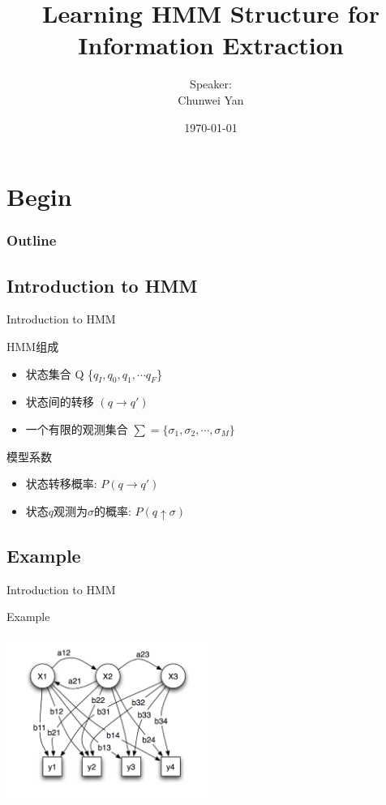 \documentclass{beamer}
\title{Learning HMM Structure for Information Extraction}
\author{Speaker:\\Chunwei Yan}
\institute[PKUSZ]{
    互联网研发中心
}
\date{\today}
\begin{document}
\begin{frame}
  \titlepage
\end{frame}

\section{Begin}
\begin{frame}
\frametitle{Outline}
\tableofcontents
\end{frame}

\subsection{Introduction to HMM}
\begin{frame}{Introduction to HMM}
\begin{block}{HMM组成 }
    \begin{itemize}
        \item 状态集合 Q \{$q_I, q_0, q_1, \cdots q_F$\}
        \item 状态间的转移 $(q \rightarrow q')$
        \item 一个有限的观测集合 $\sum = \{ \sigma_1, \sigma_2, \cdots, \sigma_M\}$
    \end{itemize}
\end{block}

\begin{block}{模型系数}
\begin{itemize}
    \item 状态转移概率: $P(q \rightarrow q')$
    \item 状态$q$观测为$\sigma$的概率: $P(q \uparrow \sigma)$ 
\end{itemize}
\end{block}
\end{frame}

\subsection{Example}
\begin{frame}{Introduction to HMM}
\begin{block}{Example}
\begin{center}
    \includegraphics[height=150pt]{report5/hmm.png}
\end{center}
\end{block}
\end{frame}
\end{document}
